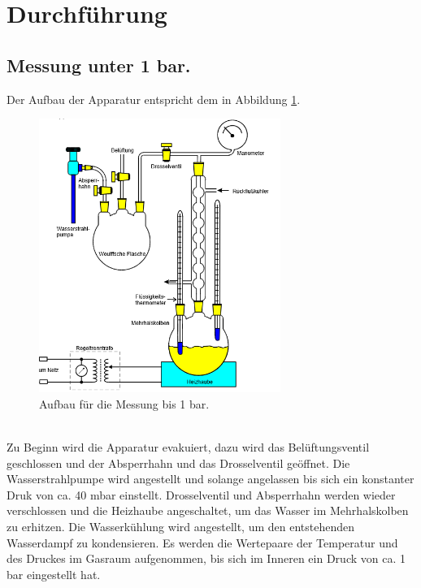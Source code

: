 \section{Durchführung}
\label{sec:Durchführung}
\subsection{Messung unter  1 bar.}
\label{sec:p<1}
Der Aufbau der Apparatur entspricht dem in Abbildung \ref{abb:aufbau1}.
\begin{figure}
  \centering
  \includegraphics[width=0.7\textwidth]{aufbau1.PNG}
  \caption{Aufbau für die Messung bis 1 bar.\cite{sample}}
  \label{abb:aufbau1}
\end{figure}\\
Zu Beginn wird die Apparatur evakuiert, dazu wird das
Belüftungsventil geschlossen und der Absperrhahn und das
Drosselventil geöffnet. Die Wasserstrahlpumpe wird angestellt
und solange angelassen bis sich ein konstanter Druk von ca. 40 mbar einstellt.
Drosselventil und Absperrhahn werden wieder verschlossen und die Heizhaube angeschaltet, um das Wasser im Mehrhalskolben zu erhitzen.
Die Wasserkühlung wird angestellt, um den entstehenden Wasserdampf zu kondensieren.
Es werden die Wertepaare der Temperatur und des Druckes im Gasraum aufgenommen,
bis sich im Inneren ein Druck von ca. 1 bar eingestellt hat.
